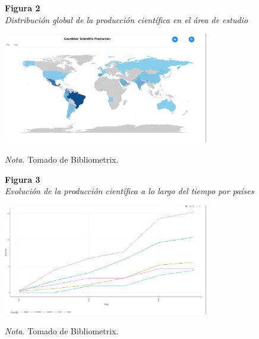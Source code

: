 \begin{figure}[htbp]
    \begin{flushleft}
        \textbf{Figura 2}\\
        \textit{Distribución global de la producción científica en el área de estudio}
    \end{flushleft}
    \centering
    \includegraphics[width=0.8\textwidth]{Images/MapaBibliometrix.png}
    \vspace{0.5em}
    \begin{flushleft}
        \textit{Nota.} Tomado de Bibliometrix.
    \end{flushleft}
    \label{fig:mapa_bibliometrix}
\end{figure}

\begin{figure}[htbp]
    \begin{flushleft}
        \textbf{Figura 3}\\
        \textit{Evolución de la producción científica a lo largo del tiempo por países}
    \end{flushleft}
    \centering
    \includegraphics[width=0.8\textwidth]{Images/GraficoLineas.png}
    \vspace{0.5em}
    \begin{flushleft}
        \textit{Nota.} Tomado de Bibliometrix.
    \end{flushleft}
    \label{fig:grafico_lineas}
\end{figure}

